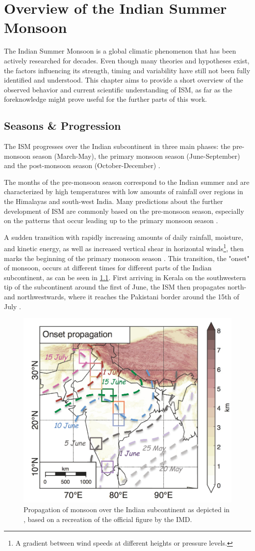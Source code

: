\chapter{Overview of the Indian Summer Monsoon}
\label{c:ism_overview}
The Indian Summer Monsoon is a global climatic phenomenon that has been actively researched for decades. Even though many theories and hypotheses exist, the factors influencing its strength, timing and variability have still not been fully identified and understood. This chapter aims to provide a short overview of the observed behavior and current scientific understanding of ISM, as far as the foreknowledge might prove useful for the further parts of this work.


\section{Seasons \& Progression}
\label{st:ism_seasons}
The ISM progresses over the Indian subcontinent in three main phases: the pre-monsoon season (March-May), the primary monsoon season (June-September) and the post-monsoon season (October-December) \citep{Stolbova.2015}.

The months of the pre-monsoon season correspond to the Indian summer and are characterized by high temperatures with low amounts of rainfall over regions in the Himalayas and south-west India. Many predictions about the further development of ISM are commonly based on the pre-monsoon season, especially on the patterns that occur leading up to the primary monsoon season \citep{Stolbova.2015}.

A sudden transition with rapidly increasing amounts of daily rainfall, moisture, and kinetic energy, as well as increased vertical shear in horizontal winds\footnote{A gradient between wind speeds at different heights or pressure levels.}, then marks the beginning of the primary monsoon season \citep{Pradhan.2017}. This transition, the "onset" of monsoon, occurs at different times for different parts of the Indian subcontinent, as can be seen in \cref{fig:onset_propagation}. First arriving in Kerala on the southwestern tip of the subcontinent around the first of June, the ISM then propagates north- and northwestwards, where it reaches the Pakistani border around the 15th of July \citep{Willetts.2017}.

\begin{figure}[h]
  \centering
  \includegraphics[width=0.45\linewidth]{./99_appendix/img/stolbova_propagation}
  \caption{Propagation of monsoon over the Indian subcontinent as depicted in \citet{Stolbova.2015}, based on a recreation of the official figure by the IMD.}
  \label{fig:onset_propagation}
\end{figure}

